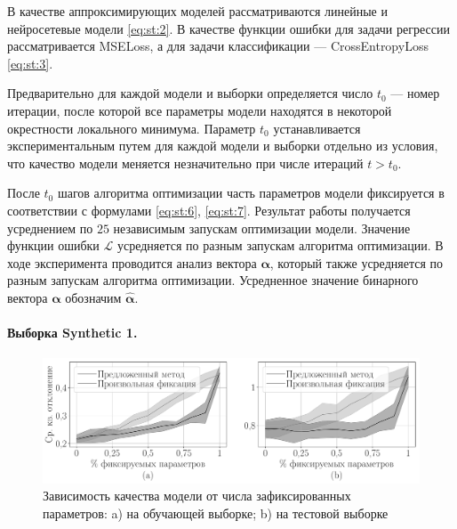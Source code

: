 В качестве аппроксимирующих моделей рассматриваются линейные и нейросетевые модели \eqref{eq:st:2}. В качестве функции ошибки для задачи регрессии рассматривается MSELoss, а для задачи классификации --- CrossEntropyLoss \eqref{eq:st:3}.

Предварительно для каждой модели и выборки определяется число $t_0$ --- номер итерации, после которой все параметры модели находятся в некоторой окрестности локального минимума. Параметр $t_0$ устанавливается экспериментальным путем для каждой модели и выборки отдельно из условия, что качество модели меняется незначительно при числе итераций $t>t_0$.

После $t_0$ шагов алгоритма оптимизации часть параметров модели фиксируется в соответствии с формулами \eqref{eq:st:6}, \eqref{eq:st:7}. Результат работы получается усреднением по $25$ независимым запускам оптимизации модели. Значение функции ошибки $\mathcal{L}$ усредняется по разным запускам алгоритма оптимизации. В ходе эксперимента проводится анализ вектора $\bm{\alpha}$, который также усредняется по разным запускам алгоритма оптимизации. Усредненное значение бинарного вектора  $\bm{\alpha}$ обозначим $\hat{\bm{\alpha}}$.


\paragraph{Выборка Synthetic 1.}

\begin{figure}[h!t]\center
\includegraphics[width=1\textwidth]{results/order/generate_data_neural_loss}
\caption{Зависимость качества модели от числа зафиксированных параметров: a) на обучающей выборке; b) на тестовой выборке}
\label{fg:ex:syn3:1}
\end{figure}


